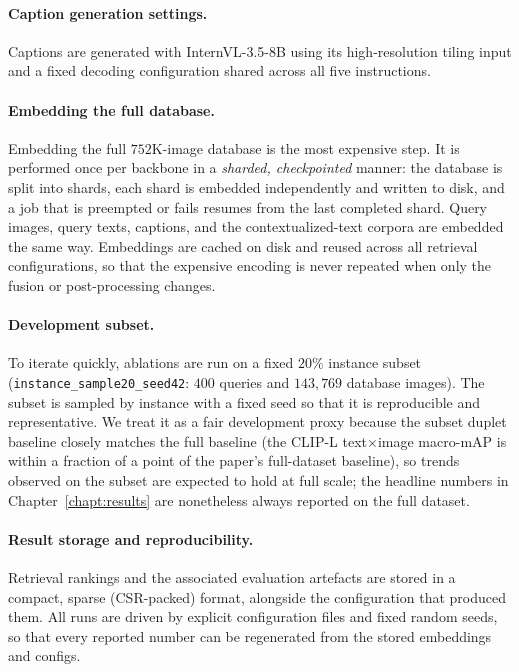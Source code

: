 \paragraph{Caption generation settings.} Captions are generated with
InternVL-3.5-8B using its high-resolution tiling input and a fixed decoding
configuration shared across all five instructions.

\paragraph{Embedding the full database.} Embedding the full $752$K-image
database is the most expensive step. It is performed once per backbone in a
\emph{sharded, checkpointed} manner: the database is split into shards, each
shard is embedded independently and written to disk, and a job that is preempted
or fails resumes from the last completed shard. Query images, query texts,
captions, and the contextualized-text corpora are embedded the same way.
Embeddings are cached on disk and reused across all retrieval configurations, so
that the expensive encoding is never repeated when only the fusion or
post-processing changes.

\paragraph{Development subset.} To iterate quickly, ablations are run on a fixed
$20\%$ instance subset (\texttt{instance\_sample20\_seed42}: $400$ queries and
$143{,}769$ database images). The subset is sampled by instance with a fixed
seed so that it is reproducible and representative. We treat it as a fair
development proxy because the subset duplet baseline closely matches the full
baseline (the CLIP-L text$\times$image macro-mAP is within a fraction of a point
of the paper's full-dataset baseline), so trends observed on the subset are
expected to hold at full scale; the headline numbers in Chapter~\ref{chapt:results}
are nonetheless always reported on the full dataset.

\paragraph{Result storage and reproducibility.} Retrieval rankings and the
associated evaluation artefacts are stored in a compact, sparse (CSR-packed)
format, alongside the configuration that produced them. All runs are driven by
explicit configuration files and fixed random seeds, so that every reported
number can be regenerated from the stored embeddings and configs.

